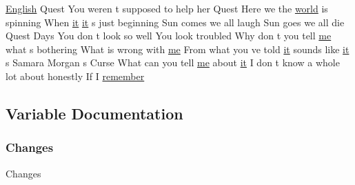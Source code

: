 \begin{DoxyCompactItemize}
\item 
\mbox{\hyperlink{_sphere_i_i_01_winter_01_project_2_config_2_localization_8txt_ad896b63205779b1b09e86d941ce13976}{English}} Quest You weren t supposed to help her Quest Here we the \mbox{\hyperlink{_sphere_i_i_01_music_01_boxes_2_config_2_localization_8txt_a7ede01351426b1b7f6c1ce5f794e474f}{world}} is spinning When \mbox{\hyperlink{_the_01_restless_01_curse_2_config_2_localization_01-_01_quest_8txt_a741b285909bea4855b886664c2dcd50c}{it}} \mbox{\hyperlink{_the_01_restless_01_curse_2_config_2_localization_01-_01_quest_8txt_a741b285909bea4855b886664c2dcd50c}{it}} s just beginning Sun comes we all laugh Sun goes we all die Quest Days You don t look so well You look troubled Why don t you tell \mbox{\hyperlink{_blooms_01_animal_01_husbandry_2_config_2_localization_8txt_a290fbecf7c016b09bc675718400d6fca}{me}} what s bothering What is wrong with \mbox{\hyperlink{_blooms_01_animal_01_husbandry_2_config_2_localization_8txt_a290fbecf7c016b09bc675718400d6fca}{me}} From what you ve told \mbox{\hyperlink{_the_01_restless_01_curse_2_config_2_localization_01-_01_quest_8txt_a741b285909bea4855b886664c2dcd50c}{it}} sounds like \mbox{\hyperlink{_the_01_restless_01_curse_2_config_2_localization_01-_01_quest_8txt_a741b285909bea4855b886664c2dcd50c}{it}} s Samara Morgan s Curse What can you tell \mbox{\hyperlink{_blooms_01_animal_01_husbandry_2_config_2_localization_8txt_a290fbecf7c016b09bc675718400d6fca}{me}} about \mbox{\hyperlink{_the_01_restless_01_curse_2_config_2_localization_01-_01_quest_8txt_a741b285909bea4855b886664c2dcd50c}{it}} I don t know a whole lot about honestly If I \mbox{\hyperlink{_the_01_restless_01_curse_2_config_2_localization_01-_01_quest_8txt_af9d6b89ef20e7afea350c66a8ae78550}{remember}}
\end{DoxyCompactItemize}


\subsection{Variable Documentation}
\mbox{\label{_the_01_restless_01_curse_2_config_2_localization_01-_01_quest_8txt_aada75e543d2eadaa69533d17cac8bd9a}} 
\subsubsection{\texorpdfstring{Changes}{Changes}}
{\footnotesize\ttfamily Changes}




